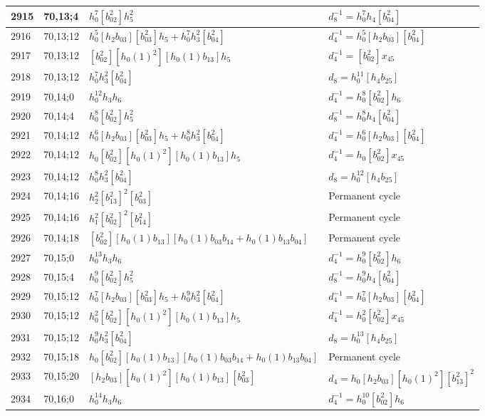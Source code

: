 \documentclass{article}
\begin{document}
\begin{longtable}{|l|l|>{\raggedright\arraybackslash}p{6cm}|>{\raggedright\arraybackslash}p{6cm}|}
\hline
2915 & 70,13;4 & $h_0^7[b_{02}^2]h_5^2$ & $d_{8}^{-1}=h_0^7h_4[b_{04}^2]$\\
\hline
2916 & 70,13;12 & $h_0^5[h_2b_{03}][b_{03}^2]h_5 + h_0^7h_3^2[b_{04}^2]$ & $d_{4}^{-1}=h_0^5[h_2b_{03}][b_{04}^2]$\\
2917 & 70,13;12 & $[b_{02}^2][h_0(1)^2][h_0(1)b_{13}]h_5$ & $d_{4}^{-1}=[b_{02}^2]x_{45}$\\
2918 & 70,13;12 & $h_0^7h_3^2[b_{04}^2]$ &$d_{8}=h_0^{11}[h_4b_{25}]$\\
\hline
2919 & 70,14;0 & $h_0^{12}h_3h_6$ & $d_{4}^{-1}=h_0^8[b_{02}^2]h_6$\\
\hline
2920 & 70,14;4 & $h_0^8[b_{02}^2]h_5^2$ & $d_{8}^{-1}=h_0^8h_4[b_{04}^2]$\\
\hline
2921 & 70,14;12 & $h_0^6[h_2b_{03}][b_{03}^2]h_5 + h_0^8h_3^2[b_{04}^2]$ & $d_{4}^{-1}=h_0^6[h_2b_{03}][b_{04}^2]$\\
2922 & 70,14;12 & $h_0[b_{02}^2][h_0(1)^2][h_0(1)b_{13}]h_5$ & $d_{4}^{-1}=h_0[b_{02}^2]x_{45}$\\
2923 & 70,14;12 & $h_0^8h_3^2[b_{04}^2]$ &$d_{8}=h_0^{12}[h_4b_{25}]$\\
\hline
2924 & 70,14;16 & $h_2^2[b_{13}^2]^2[b_{03}^2]$ & Permanent cycle\\
2925 & 70,14;16 & $h_1^2[b_{02}^2]^2[b_{14}^2]$ & Permanent cycle\\
\hline
2926 & 70,14;18 & $[b_{02}^2][h_0(1)b_{13}][h_0(1)b_{03}b_{14} + h_0(1)b_{13}b_{04}]$ & Permanent cycle\\
\hline
2927 & 70,15;0 & $h_0^{13}h_3h_6$ & $d_{4}^{-1}=h_0^9[b_{02}^2]h_6$\\
\hline
2928 & 70,15;4 & $h_0^9[b_{02}^2]h_5^2$ & $d_{8}^{-1}=h_0^9h_4[b_{04}^2]$\\
\hline
2929 & 70,15;12 & $h_0^7[h_2b_{03}][b_{03}^2]h_5 + h_0^9h_3^2[b_{04}^2]$ & $d_{4}^{-1}=h_0^7[h_2b_{03}][b_{04}^2]$\\
2930 & 70,15;12 & $h_0^2[b_{02}^2][h_0(1)^2][h_0(1)b_{13}]h_5$ & $d_{4}^{-1}=h_0^2[b_{02}^2]x_{45}$\\
2931 & 70,15;12 & $h_0^9h_3^2[b_{04}^2]$ &$d_{8}=h_0^{13}[h_4b_{25}]$\\
\hline
2932 & 70,15;18 & $h_0[b_{02}^2][h_0(1)b_{13}][h_0(1)b_{03}b_{14} + h_0(1)b_{13}b_{04}]$ & Permanent cycle\\
\hline
2933 & 70,15;20 & $[h_2b_{03}][h_0(1)^2][h_0(1)b_{13}][b_{03}^2]$ &$d_{4}=h_0[h_2b_{03}][h_0(1)^2][b_{13}^2]^2$\\
\hline
2934 & 70,16;0 & $h_0^{14}h_3h_6$ & $d_{4}^{-1}=h_0^{10}[b_{02}^2]h_6$\\

\end{longtable}
\end{document}
